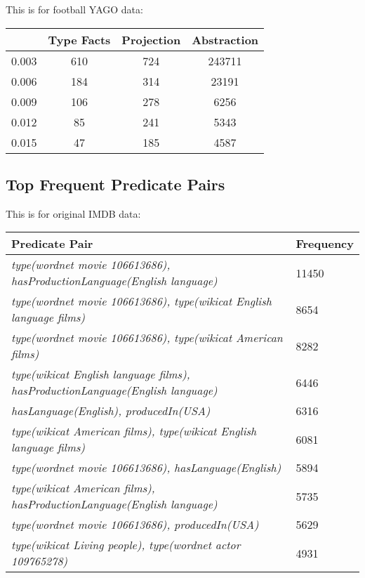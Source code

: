\documentclass{acm_proc_article-sp}
\begin{document}
This is for football YAGO data:

\begin{center}
\begin{tabular}{ |c|c|c|c| } 
\hline
 & Type Facts & Projection & Abstraction\\
\hline
0.003 & 610 & 724 & 243711 \\
0.006 & 184 & 314 & 23191 \\
0.009 & 106 & 278 & 6256 \\
0.012 & 85 & 241 & 5343 \\
0.015 & 47 & 185 & 4587 \\
\hline
\end{tabular}
\end{center}

\subsection{Top Frequent Predicate Pairs}

This is for original IMDB data:

\begin{center}
\begin{tabular}{ |p{6cm}|p{1.5cm}| } 
\hline
Predicate Pair & Frequency\\
\hline
\textit{type(wordnet movie 106613686), hasProductionLanguage(English language)} & 11450 \\
\hline
\textit{type(wordnet movie 106613686), type(wikicat English language films)} & 8654 \\
\hline
\textit{type(wordnet movie 106613686), type(wikicat American films)} & 8282 \\
\hline
\textit{type(wikicat English language films), hasProductionLanguage(English language)} & 6446 \\
\hline
\textit{hasLanguage(English), producedIn(USA)} & 6316 \\
\hline
\textit{type(wikicat American films), type(wikicat English language films)} & 6081 \\
\hline
\textit{type(wordnet movie 106613686), hasLanguage(English)} & 5894 \\
\hline
\textit{type(wikicat American films), hasProductionLanguage(English language)} & 5735 \\
\hline
\textit{type(wordnet movie 106613686), producedIn(USA)} & 5629 \\
\hline
\textit{type(wikicat Living people), type(wordnet actor 109765278)} & 4931 \\
\hline
\end{tabular}
\end{center}
\end{document}
